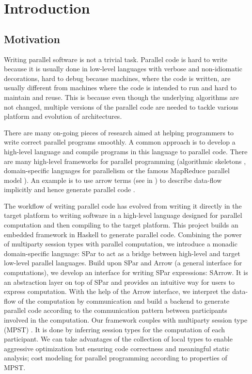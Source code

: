 \tableofcontents
\chapter{Introduction} \label{chap:intro}

\section{Motivation} \label{i:m}
Writing parallel software is not a trivial task. Parallel code is hard to write because it is usually done in low-level languages with verbose and non-idiomatic decorations, hard to debug because machines, where the code is written, are usually different from machines where the code is intended to run and hard to maintain and reuse. This is because even though the underlying algorithms are not changed, multiple versions of the parallel code are needed to tackle various platform and evolution of architectures.

There are many on-going pieces of research aimed at helping programmers to write correct parallel programs smoothly. A common approach is to develop a high-level language and compile programs in this language to parallel code. There are many high-level frameworks for parallel programming (\eg algorithmic skeletons \cite{coleAlgorithmicSkeletonsStructured1989}, domain-specific languages for parallelism \cite{brownHeterogeneousParallelFramework2011} or the famous MapReduce parallel model \cite{liMapReduceParallelProgramming2016}). An example is to use arrow terms (see in ) to describe data-flow implicitly and hence generate parallel code \cite{braunArrowsParallelComputation2018}.

The workflow of writing parallel code has evolved from writing it directly in the target platform to writing software in a high-level language designed for parallel computation and then compiling to the target platform. This project builds an embedded framework in Haskell to generate parallel code. Combining the power of multiparty session types with parallel computation, we introduce a monadic domain-specific language: SPar to act as a bridge between high-level and target low-level parallel languages. Build upon SPar and Arrow (a general interface for computations), we develop an interface for writing SPar expressions: SArrow. It is an abstraction layer on top of SPar and provides an intuitive way for users to express computation. With the help of the Arrow interface, we interpret the data-flow of the computation by communication and build a backend to generate parallel code according to the communication pattern between participants involved in the computation. Our framework couples with multiparty session type (MPST) \cite{coppoGentleIntroductionMultiparty2015}. It is done by inferring session types for the computation of each participant. We can take advantages of the collection of local types to enable aggressive optimization but ensuring code correctness and meaningful static analysis; \eg cost modeling for parallel programming according to properties of MPST.

